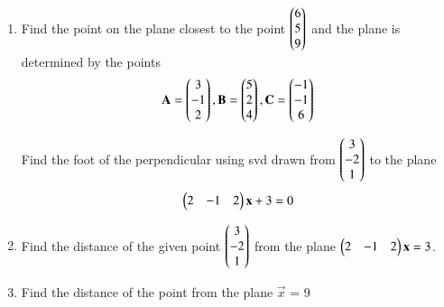 \begin{enumerate}[label=\thesection.\arabic*.,ref=\thesection.\theenumi]
\solution

\item Find the point on the plane closest to the point $\begin{pmatrix}6\\5\\9\end{pmatrix}$ and the plane is determined by the points 
\begin{align*}
    \mathbf{A}=\begin{pmatrix}3\\-1\\2\end{pmatrix}, \mathbf{B}=\begin{pmatrix}5\\2\\4\end{pmatrix}, \mathbf{C}=\begin{pmatrix}-1\\-1\\6\end{pmatrix}
\end{align*}
\solution

%
 Find the foot of the perpendicular using svd drawn from $\begin{pmatrix}3\\-2\\1\end{pmatrix}$ to the plane
 \begin{align}
 \begin{pmatrix}2&-1&2\end{pmatrix}\mathbf{x}+3=0
 \end{align}
%
\solution
%
%
\item 
Find the distance of the given point $\begin{pmatrix}3\\-2\\1\end{pmatrix}$ from the plane $\begin{pmatrix}2&-1&2\end{pmatrix}\mathbf{x} = 3$.

\solution

%
\item Find the distance of the point  from the plane $\vec{x}$ = 9

\solution
%

\end{enumerate}

